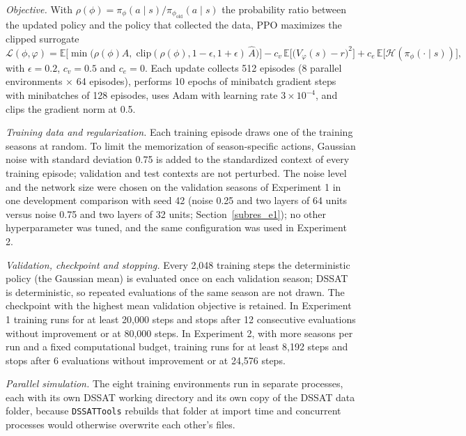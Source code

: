 \documentclass[times,final,authoryear]{elsarticle}
\begin{document}
\emph{Objective.} With $\rho(\phi) = \pi_\phi(a \mid s)/\pi_{\phi_{\text{old}}}(a \mid s)$ the probability ratio between the updated policy and the policy that collected the data, PPO maximizes the clipped surrogate
\begin{equation}
\mathcal{L}(\phi,\varphi) = \mathbb{E}\Big[\min\big(\rho(\phi)\hat{A},\; \mathrm{clip}(\rho(\phi), 1-\epsilon, 1+\epsilon)\,\hat{A}\big)\Big] - c_v\, \mathbb{E}\Big[\big(V_\varphi(s) - r\big)^2\Big] + c_e\, \mathbb{E}\big[\mathcal{H}(\pi_\phi(\cdot \mid s))\big],
\label{eq_ppo}
\end{equation}
with $\epsilon = 0.2$, $c_v = 0.5$ and $c_e = 0$. Each update collects 512 episodes (8 parallel environments $\times$ 64 episodes), performs 10 epochs of minibatch gradient steps with minibatches of 128 episodes, uses Adam with learning rate $3\times 10^{-4}$, and clips the gradient norm at 0.5.

\emph{Training data and regularization.} Each training episode draws one of the training seasons at random. To limit the memorization of season-specific actions, Gaussian noise with standard deviation 0.75 is added to the standardized context of every training episode; validation and test contexts are not perturbed. The noise level and the network size were chosen on the validation seasons of Experiment 1 in one development comparison with seed 42 (noise 0.25 and two layers of 64 units versus noise 0.75 and two layers of 32 units; Section~\ref{subres_e1}); no other hyperparameter was tuned, and the same configuration was used in Experiment 2.

\emph{Validation, checkpoint and stopping.} Every 2,048 training steps the deterministic policy (the Gaussian mean) is evaluated once on each validation season; DSSAT is deterministic, so repeated evaluations of the same season are not drawn. The checkpoint with the highest mean validation objective is retained. In Experiment 1 training runs for at least 20,000 steps and stops after 12 consecutive evaluations without improvement or at 80,000 steps. In Experiment 2, with more seasons per run and a fixed computational budget, training runs for at least 8,192 steps and stops after 6 evaluations without improvement or at 24,576 steps.

\emph{Parallel simulation.} The eight training environments run in separate processes, each with its own DSSAT working directory and its own copy of the DSSAT data folder, because \texttt{DSSATTools} rebuilds that folder at import time and concurrent processes would otherwise overwrite each other's files.
\end{document}
